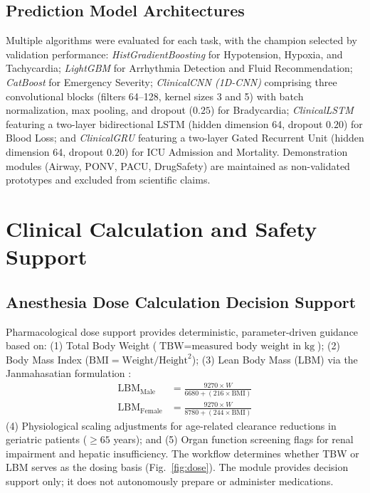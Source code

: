 \documentclass[conference]{IEEEtran}
\begin{document}
\subsection{Prediction Model Architectures}
Multiple algorithms were evaluated for each task, with the champion selected by validation performance: \textit{HistGradientBoosting} for Hypotension, Hypoxia, and Tachycardia; \textit{LightGBM} \cite{ref6} for Arrhythmia Detection and Fluid Recommendation; \textit{CatBoost} \cite{ref7} for Emergency Severity; \textit{ClinicalCNN (1D-CNN)} comprising three convolutional blocks (filters 64--128, kernel sizes 3 and 5) with batch normalization, max pooling, and dropout ($0.25$) for Bradycardia; \textit{ClinicalLSTM} featuring a two-layer bidirectional LSTM (hidden dimension 64, dropout $0.20$) for Blood Loss; and \textit{ClinicalGRU} featuring a two-layer Gated Recurrent Unit (hidden dimension 64, dropout $0.20$) for ICU Admission and Mortality. Demonstration modules (Airway, PONV, PACU, DrugSafety) are maintained as non-validated prototypes and excluded from scientific claims.

\section{Clinical Calculation and Safety Support}

\subsection{Anesthesia Dose Calculation Decision Support}
Pharmacological dose support provides deterministic, parameter-driven guidance based on: (1) Total Body Weight ($\text{TBW} = \text{measured body weight in kg}$); (2) Body Mass Index ($\text{BMI} = \text{Weight} / \text{Height}^2$); (3) Lean Body Mass (LBM) via the Janmahasatian formulation \cite{ref13}:
\begin{align}
\text{LBM}_{\text{Male}} &= \frac{9270 \times W}{6680 + (216 \times \text{BMI})} \label{eq:lbm_male} \\
\text{LBM}_{\text{Female}} &= \frac{9270 \times W}{8780 + (244 \times \text{BMI})} \label{eq:lbm_female}
\end{align}
(4) Physiological scaling adjustments for age-related clearance reductions in geriatric patients ($\ge 65$ years); and (5) Organ function screening flags for renal impairment and hepatic insufficiency. The workflow determines whether TBW or LBM serves as the dosing basis (Fig.~\ref{fig:dose}). The module provides decision support only; it does not autonomously prepare or administer medications.
\end{document}
